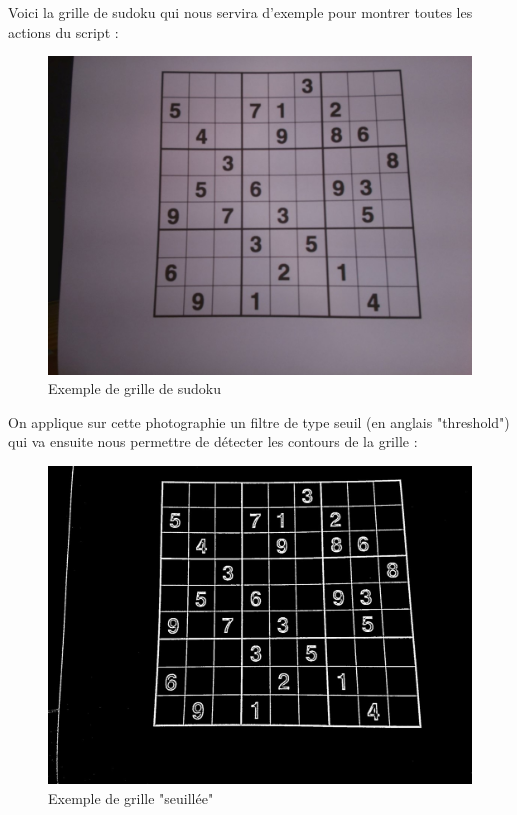 \documentclass[12pt,a4paper]{report}
\begin{document}
Voici la grille de sudoku qui nous servira d'exemple pour montrer toutes les actions du script :
\begin{figure}[!h]
 \center
 \includegraphics[scale=0.25]{../pictures/example.jpg}
 \caption{Exemple de grille de sudoku}
\end{figure}
\newpage
On applique sur cette photographie un filtre de type seuil (en anglais "threshold") qui va ensuite nous permettre de détecter les contours de la grille :

\begin{figure}[!h]
 \center
 \includegraphics[scale=0.25]{../pictures/threshold.jpg}
 \caption{Exemple de grille "seuillée"}
 \end{figure}
 
\end{document}
